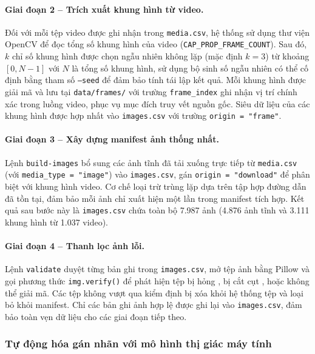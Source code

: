 \paragraph{Giai đoạn 2 -- Trích xuất khung hình từ video.}
Đối với mỗi tệp video được ghi nhận trong \texttt{media.csv}, hệ thống sử dụng thư
viện OpenCV để đọc tổng số khung hình của video (\texttt{CAP\_PROP\_FRAME\_COUNT}).
Sau đó, $k$ chỉ số khung hình được chọn ngẫu nhiên không lặp (mặc định $k=3$) từ
khoảng $[0, N-1]$ với $N$ là tổng số khung hình, sử dụng bộ sinh số ngẫu nhiên có
thể cố định bằng tham số \texttt{--seed} để đảm bảo tính tái lập kết quả. Mỗi khung
hình được giải mã và lưu tại \texttt{data/frames/} với trường \texttt{frame\_index}
ghi nhận vị trí chính xác trong luồng video, phục vụ mục đích truy vết nguồn gốc.
Siêu dữ liệu của các khung hình được hợp nhất vào \texttt{images.csv} với trường
\texttt{origin = "frame"}.

\paragraph{Giai đoạn 3 -- Xây dựng manifest ảnh thống nhất.}
Lệnh \texttt{build-images} bổ sung các ảnh tĩnh đã tải xuống trực tiếp từ
\texttt{media.csv} (với \texttt{media\_type = "image"}) vào \texttt{images.csv}, gán
\texttt{origin = "download"} để phân biệt với khung hình video. Cơ chế loại trừ trùng
lặp dựa trên tập hợp đường dẫn đã tồn tại, đảm bảo mỗi ảnh
chỉ xuất hiện một lần trong manifest tích hợp. Kết quả sau bước này là \texttt{images.csv}
chứa toàn bộ 7.987 ảnh (4.876 ảnh tĩnh và 3.111 khung hình từ 1.037 video).

\paragraph{Giai đoạn 4 -- Thanh lọc ảnh lỗi.}
Lệnh \texttt{validate} duyệt từng bản ghi trong \texttt{images.csv}, mở tệp ảnh bằng
Pillow và gọi phương thức \texttt{img.verify()} để phát hiện tệp bị hỏng
, bị cắt cụt , hoặc không thể giải mã.
Các tệp không vượt qua kiểm định bị xóa khỏi hệ thống tệp và loại bỏ khỏi manifest.
Chỉ các bản ghi ảnh hợp lệ được ghi lại vào \texttt{images.csv}, đảm bảo toàn vẹn
dữ liệu cho các giai đoạn tiếp theo.



\subsubsection{Tự động hóa gán nhãn với mô hình thị giác máy tính}

